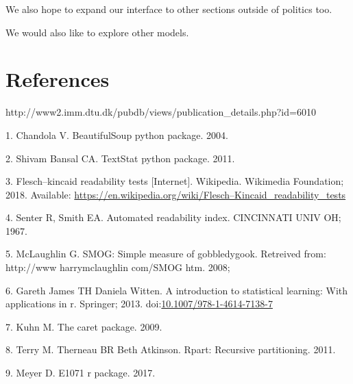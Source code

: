 \documentclass[10pt,letterpaper]{article}
\begin{document}
We also hope to expand our interface to other sections outside of
politics too.

We would also like to explore other models.

\hypertarget{references}{%
\section*{References}\label{references}}

http://www2.imm.dtu.dk/pubdb/views/publication\_details.php?id=6010

\hypertarget{refs}{}
\leavevmode\hypertarget{ref-BeautifulSoup}{}%
1. Chandola V. BeautifulSoup python package. 2004.

\leavevmode\hypertarget{ref-textstat}{}%
2. Shivam Bansal CA. TextStat python package. 2011.

\leavevmode\hypertarget{ref-wikipedia_2018}{}%
3. Flesch--kincaid readability tests {[}Internet{]}. Wikipedia.
Wikimedia Foundation; 2018. Available:
\url{https://en.wikipedia.org/wiki/Flesch–Kincaid_readability_tests}

\leavevmode\hypertarget{ref-senter1967automated}{}%
4. Senter R, Smith EA. Automated readability index. CINCINNATI UNIV OH;
1967.

\leavevmode\hypertarget{ref-mclaughlin2008smog}{}%
5. McLaughlin G. SMOG: Simple measure of gobbledygook. Retreived from:
http://www harrymclaughlin com/SMOG htm. 2008;

\leavevmode\hypertarget{ref-MLbook}{}%
6. Gareth James TH Daniela Witten. A introduction to statistical
learning: With applications in r. Springer; 2013.
doi:\href{https://doi.org/10.1007/978-1-4614-7138-7}{10.1007/978-1-4614-7138-7}

\leavevmode\hypertarget{ref-Kuhn09thecaret}{}%
7. Kuhn M. The caret package. 2009.

\leavevmode\hypertarget{ref-rpart}{}%
8. Terry M. Therneau BR Beth Atkinson. Rpart: Recursive partitioning.
2011.

\leavevmode\hypertarget{ref-e1071}{}%
9. Meyer D. E1071 r package. 2017.

\nolinenumbers
\end{document}
